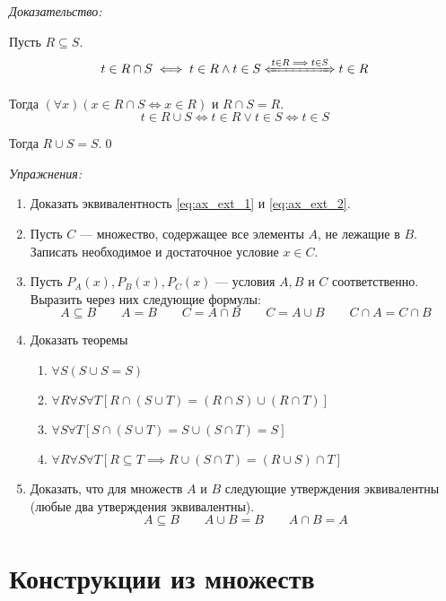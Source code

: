 {\it Доказательство:}

Пусть $R\subseteq S$.
\[
  t\in R\cap S\iff t\in R\land t\in S\xLeftrightarrow{t\in R\implies t\in S} t\in R
\]

Тогда $(\forall x)(x\in R\cap S\iff x\in R)$ и $R\cap S=R$.
\[
  t\in R\cup S\iff t\in R\lor t\in S\iff t\in S
\]

Тогда $R\cup S=S$.\qed

\newcommand\eset{\varnothing}
\vspace{1em}
{\it Упражнения:}
\begin{enumerate}
  \item{}Доказать эквивалентность \eqref{eq:ax_ext_1} и \eqref{eq:ax_ext_2}.

  \item{}Пусть $C$ --- множество, содержащее все элементы $A$, не лежащие в $B$.
  Записать необходимое и достаточное условие $x\in C$.

  \item{}Пусть $P_{A}(x), P_{B}(x),P_{C}(x)$ --- условия $A,B$ и $C$ соответственно.
  Выразить через них следующие формулы:
  \[
    A\subseteq B\qquad A=B\qquad
    C=A\cap B\qquad C=A\cup B\qquad
    C\cap A=C\cap B
  \]

  \item{}Доказать теоремы
  \begin{fullwidth}
    \begin{multicols}{2}
      \begin{enumerate}
        \item{}$\forall S(S\cup S=S)$
        \item{}$\forall R\forall S\forall T[R\cap (S\cup T)=(R\cap S)\cup (R\cap T)]$
        \item{}$\forall S\forall T[S\cap (S\cup T)=S\cup (S\cap T)=S]$
        \item{}$\forall R\forall S\forall T[R\subseteq T
              \implies R\cup (S\cap T)=(R\cup S)\cap T]$
      \end{enumerate}
    \end{multicols}
  \end{fullwidth}


  \item{}Доказать, что для множеств $A$ и $B$ следующие утверждения эквивалентны
  (любые два утверждения эквивалентны).
  \[
    A\subseteq B\qquad A\cup B=B\qquad A\cap B=A
  \]
\end{enumerate}

\section{Конструкции из множеств}

